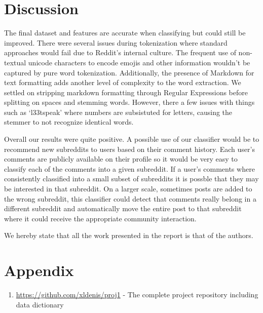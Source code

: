\documentclass[10pt,twocolumn]{article}
\begin{document}
\section{Discussion}
The final dataset and features are accurate when classifying but could still be improved. There were several issues during tokenization where standard approaches would fail due to Reddit's internal culture. The frequent use of non-textual unicode characters to encode emojis and other information wouldn't be captured by pure word tokenization. Additionally, the presence of Markdown\cite{gruber} for text formatting adds another level of complexity to the word extraction. We settled on stripping markdown formatting through Regular Expressions before splitting on spaces and stemming\cite{porter1980algorithm} words. However, there a few issues with things such as `l33tspeak' where numbers are subsistuted for letters, causing the stemmer to not recognize identical words. 

Overall our results were quite positive. A possible use of our classifier would be to recommend new subreddits to users based on their comment history. Each user's comments are publicly available on their profile so it would be very easy to classify each of the comments into a given subreddit. If a user's comments where consistently classified into a small subset of subreddits it is possble that they may be interested in that subreddit. On a larger scale, sometimes posts are added to the wrong subreddit, this classifier could detect that comments really belong in a different subreddit and automatically move the entire post to that subreddit where it could receive the appropriate community interaction.

We hereby state that all the work presented in the report is that of the authors.

\printbibliography
\section{Appendix}
\begin {enumerate}
\item \url{https://github.com/xldenis/proj1} - The complete project repository including data dictionary
\end{enumerate}
\end{document}
